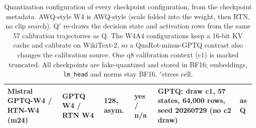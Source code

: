 \begin{table}[t]
\begin{tabular}{@{}P{2.15cm}P{2.15cm}P{1.55cm}P{1.0cm}P{4.0cm}P{3.7cm}@{}}
\addlinespace[3pt]
Mistral GPTQ-W4 / RTN-W4 (m24) & GPTQ W4 / RTN W4 & 128, asym. & yes / n/a & GPTQ: draw c1, 57 states, 64{,}000 rows, seed 20260729 (no c2 draw) & as Q \\
\bottomrule
\end{tabular}
\caption{Quantization configuration of every checkpoint configuration, from the checkpoint metadata. AWQ-style W4 is AWQ-style (scale folded into the weight, then RTN, no clip search). Q$'$ re-draws the decision state and activation rows from the same 57 calibration trajectories as Q. The W4A4 configurations keep a 16-bit KV cache and calibrate on WikiText-2, so a QuaRot-minus-GPTQ contrast also changes the calibration source. One q8 calibration context (c1) is marked truncated. All checkpoints are fake-quantized and stored in BF16; embeddings, \texttt{lm\_head} and norms stay BF16. $^s$stress cell.}
\label{tab:qconfig}
\end{table}


